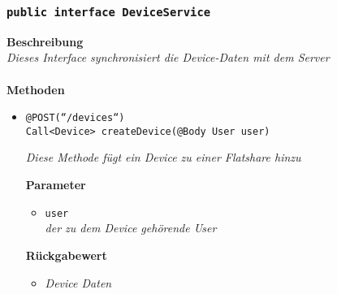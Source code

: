 	\subsubsection{\texttt{public interface DeviceService }}
	\textbf{Beschreibung}\\
	\textit{Dieses Interface synchronisiert die Device-Daten mit dem Server}\\
\\
	\textbf{Methoden} \\
		\begin{itemize}
		\item\texttt{{@POST(``/devices``) \\ Call<Device> createDevice(@Body User user)}}

		\textit{Diese Methode fügt ein Device zu einer Flatshare hinzu}

		\textbf{Parameter} 
			\begin{itemize}
				\item\texttt{user}\\
		 		\textit{der zu dem Device gehörende User}
	 		\end{itemize}

		\textbf{Rückgabewert} 
		\begin{itemize}
		\item\textit{Device Daten}
		\end{itemize}

	 \end{itemize}
